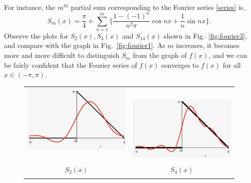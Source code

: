 \documentclass[12pt]{article}
\numberwithin{equation}{section}
\begin{document}
For instance, the $m^{th}$ partial sum corresponding to the Fourier series \eqref{series} is,
\[
S_m(x)= \frac{\pi}{4}+\sum _{n=1}^m \{ \frac{1-(-1)^n}{n^2\pi} \cos nx + 
\frac{1}{n} \sin nx \}.
\]
Observe the plots for  $S_2(x), S_4(x)$ and $S_{14}(x)$ shown in Fig.~\ref{fig:fourier3}, and 
compare with the graph in Fig.~\ref{fig:fourier1}. As $m$ increases, it becomes more and more difficult to distinguish $S_m$ from the graph of $f(x)$, and we can be fairly confident that the Fourier series of $f(x)$ converges to $f(x)$ for all $x \in (-\pi,\pi)$.
\begin{figure}[H]
\centering
\begin{tabular}{cc}
\includegraphics[scale=0.25]{Figs/s2.jpg}~~&~~\includegraphics[scale=0.25]{Figs/s4.jpg}\\
$S_2(x)$&$S_4(x)$\\
&\\

\end{tabular}
\end{figure}
\end{document}
